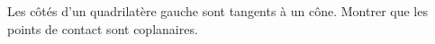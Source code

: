 Les côtés d'un quadrilatère gauche sont tangents à un cône. Montrer que les points de contact sont coplanaires.
